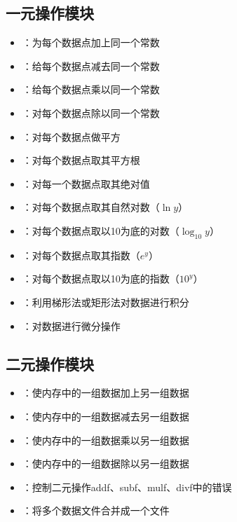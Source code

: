 \subsection*{一元操作模块}
\begin{itemize}
\item {}：为每个数据点加上同一个常数
\item {}：给每个数据点减去同一个常数
\item {}：给每个数据点乘以同一个常数
\item {}：对每个数据点除以同一个常数
\item {}：对每个数据点做平方
\item {}：对每个数据点取其平方根
\item {}：对每一个数据点取其绝对值
\item {}：对每个数据点取其自然对数（$\ln y$）
\item {}：对每个数据点取以10为底的对数（$\log_{10} y$）
\item {}：对每个数据点取其指数（$e^y$）
\item {}：对每个数据点取以10为底的指数（$10^y$）
\item {}：利用梯形法或矩形法对数据进行积分
\item {}：对数据进行微分操作
\end{itemize}

\subsection*{二元操作模块}
\begin{itemize}
\item {}：使内存中的一组数据加上另一组数据
\item {}：使内存中的一组数据减去另一组数据
\item {}：使内存中的一组数据乘以另一组数据
\item {}：使内存中的一组数据除以另一组数据
\item {}：控制二元操作addf、subf、mulf、divf中的错误
\item {}：将多个数据文件合并成一个文件
\end{itemize}

